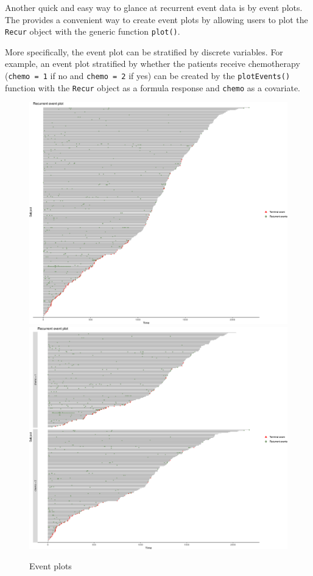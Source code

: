 Another quick and easy way to glance at recurrent event data is by event
plots. The  provides a convenient way to create event plots
by allowing users to plot the \texttt{Recur} object with the generic
function \texttt{plot()}.

More specifically, the event plot can be stratified by discrete
variables. For example, an event plot stratified by whether the patients
receive chemotherapy (\texttt{chemo\ =\ 1} if no and
\texttt{chemo\ =\ 2} if yes) can be created by the \texttt{plotEvents()}
function with the \texttt{Recur} object as a formula response and
\texttt{chemo} as a covariate.

\begin{figure}[H]
\caption{Event plots}
\begin{center}
\includegraphics[scale = .125]{images/ep-1}
\includegraphics[scale = .125]{images/epChemo-1}
\end{center}
\end{figure}
